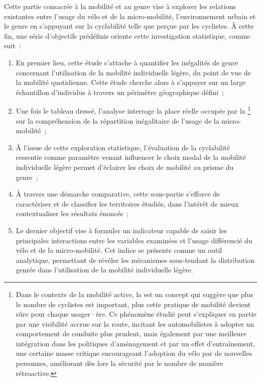 \begin{refsegment}
Cette partie consacrée à la mobilité et au genre vise à explorer les relations existantes entre l'usage du vélo et de la micro-mobilité, l'environnement urbain et le genre en s'appuyant sur la cyclabilité telle que perçue par les cyclistes. À cette fin, une série d'objectifs prédéfinis oriente cette investigation statistique, comme suit~:
\begin{enumerate}
    \item En premier lieu, cette étude s'attache à quantifier les inégalités de genre concernant l'utilisation de la mobilité individuelle légère, du point de vue de la mobilité quotidienne. Cette étude cherche alors à s'appuyer sur un large échantillon d'individus à travers un périmètre géographique défini~;
    \item Une fois le tableau dressé, l'analyse interroge la place réelle occupée par la \footnote{
Dans le contexte de la mobilité active, la  est un concept qui suggère que plus le nombre de cyclistes est important, plus cette pratique de mobilité devient sûre pour chaque usager·ère. Ce phénomène étudié peut s'expliquer en partie par une visibilité accrue sur la route, incitant les automobilistes à adopter un comportement de conduite plus prudent, mais également par une meilleure intégration dans les politiques d'aménagement et par un effet d'entraînement, une certaine masse critique encourageant l'adoption du vélo par de nouvelles personnes, améliorant dès lors la sécurité par le nombre de manière rétroactive.
} sur la compréhension de la répartition inégalitaire de l'usage de la micro-mobilité~;
    \item À l'issue de cette exploration statistique, l'évaluation de la cyclabilité ressentie comme paramètre venant influencer le choix modal de la mobilité individuelle légère permet d'éclairer les choix de mobilité au prisme du genre~;
    \item À travers une démarche comparative, cette sous-partie s'efforce de caractériser et de classifier les territoires étudiés, dans l'intérêt de mieux contextualiser les résultats énoncés~;
    \item Le dernier objectif vise à formuler un indicateur capable de saisir les principales interactions entre les variables examinées et l'usage différencié du vélo et de la micro-mobilité. Cet indice se présente comme un outil analytique, permettant de révéler les mécanismes sous-tendant la distribution genrée dans l'utilisation de la mobilité individuelle légère.
\end{enumerate}%


\end{refsegment}
